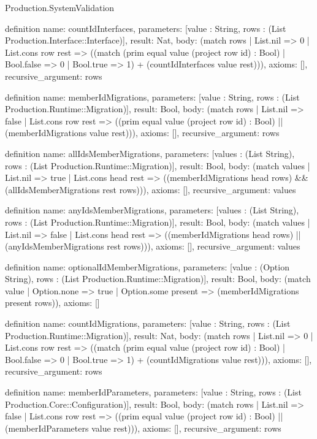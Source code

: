 \begin{lexlean}{Production.SystemValidation}
\begin{semanticmodule}
definition{
  name: countIdInterfaces,
  parameters: [value : String, rows : (List Production.Interface::Interface)],
  result: Nat,
  body: (match rows
    | List.nil => 0
    | List.cons row rest => ((match (prim equal value (project row id) : Bool)
      | Bool.false => 0
      | Bool.true => 1) + (countIdInterfaces value rest))),
  axioms: [],
  recursive_argument: rows
}

definition{
  name: memberIdMigrations,
  parameters: [value : String, rows : (List Production.Runtime::Migration)],
  result: Bool,
  body: (match rows
    | List.nil => false
    | List.cons row rest => ((prim equal value (project row id) : Bool) || (memberIdMigrations value rest))),
  axioms: [],
  recursive_argument: rows
}

definition{
  name: allIdsMemberMigrations,
  parameters: [values : (List String), rows : (List Production.Runtime::Migration)],
  result: Bool,
  body: (match values
    | List.nil => true
    | List.cons head rest => ((memberIdMigrations head rows) && (allIdsMemberMigrations rest rows))),
  axioms: [],
  recursive_argument: values
}

definition{
  name: anyIdsMemberMigrations,
  parameters: [values : (List String), rows : (List Production.Runtime::Migration)],
  result: Bool,
  body: (match values
    | List.nil => false
    | List.cons head rest => ((memberIdMigrations head rows) || (anyIdsMemberMigrations rest rows))),
  axioms: [],
  recursive_argument: values
}

definition{
  name: optionalIdMemberMigrations,
  parameters: [value : (Option String), rows : (List Production.Runtime::Migration)],
  result: Bool,
  body: (match value
    | Option.none => true
    | Option.some present => (memberIdMigrations present rows)),
  axioms: []
}

definition{
  name: countIdMigrations,
  parameters: [value : String, rows : (List Production.Runtime::Migration)],
  result: Nat,
  body: (match rows
    | List.nil => 0
    | List.cons row rest => ((match (prim equal value (project row id) : Bool)
      | Bool.false => 0
      | Bool.true => 1) + (countIdMigrations value rest))),
  axioms: [],
  recursive_argument: rows
}

definition{
  name: memberIdParameters,
  parameters: [value : String, rows : (List Production.Core::Configuration)],
  result: Bool,
  body: (match rows
    | List.nil => false
    | List.cons row rest => ((prim equal value (project row id) : Bool) || (memberIdParameters value rest))),
  axioms: [],
  recursive_argument: rows
}


\end{semanticmodule}
\end{lexlean}
